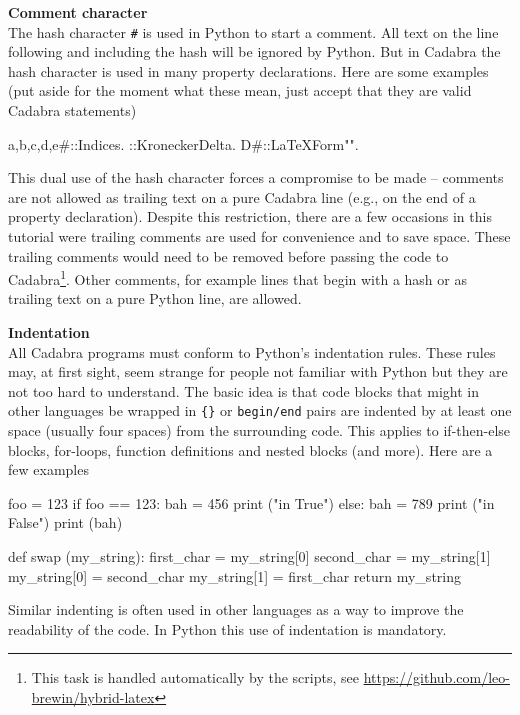 \documentclass[a4paper,12pt]{article}
\numberwithin{equation}{section}%
\begin{document}
{\bf Comment character}\\[5pt]
The hash character \verb|#| is used in Python to start a comment. All text on the line
following and including the hash will be ignored by Python. But in Cadabra the hash
character is used in many property declarations. Here are some examples (put aside for the
moment what these mean, just accept that they are valid Cadabra statements)
\begin{cadabra}[numbers=none]
   {a,b,c,d,e#}::Indices.
   \delta{#}::KroneckerDelta.
   D{#}::LaTeXForm{"\nabla"}.
\end{cadabra}
This dual use of the hash character forces a compromise to be made -- comments are not
allowed as trailing text on a pure Cadabra line (e.g., on the end of a property
declaration). Despite this restriction, there are a few occasions in this tutorial were
trailing comments are used for convenience and to save space. These trailing comments would
need to be removed before passing the code to Cadabra\footnote{This task is handled
automatically by the  scripts, see
\url{https://github.com/leo-brewin/hybrid-latex}}. Other comments, for example lines that
begin with a hash or as trailing text on a pure Python line, are allowed.

{\bf Indentation}\\[5pt]
All Cadabra programs must conform to Python's indentation rules. These rules may,
at first sight, seem strange for people not familiar with Python but they are not
too hard to understand. The basic idea is that code blocks that might in other
languages be wrapped in \verb|{}| or \verb|begin/end| pairs are indented by at least
one space (usually four spaces) from the surrounding code. This applies to
if-then-else blocks, for-loops, function definitions and nested blocks (and more).
Here are a few examples
\begin{cadabra}[numbers=none]
   foo = 123
   if foo == 123:
      bah = 456
      print ("in True")
   else:
      bah = 789
      print ("in False")
   print (bah)

   def swap (my_string):
       first_char   = my_string[0]
       second_char  = my_string[1]
       my_string[0] = second_char
       my_string[1] = first_char
       return my_string
\end{cadabra}
Similar indenting is often used in other languages as a way to improve the
readability of the code. In Python this use of indentation is mandatory.
\end{document}
